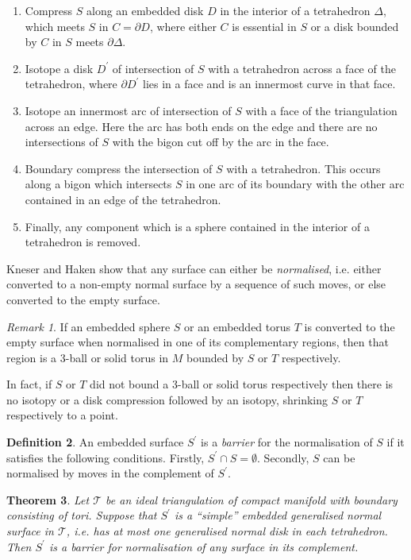 \documentclass[12pt,reqno]{amsart}  %
\newtheorem{thm}{Theorem}[section]
\theoremstyle{definition}
\newtheorem{defn}[thm]{Definition}
\theoremstyle{remark}
\newtheorem{rmk}[thm]{Remark}
\def\D{\Delta}
\newcommand{\T}{\mathcal{T}}
\begin{document}
\begin{enumerate}
\item 
Compress $S$ along an embedded disk $D$ in the interior of a tetrahedron 
$\D$, which meets $S$ in $C=\partial D$, where  either $C$ is essential in 
$S$ or a disk bounded by $C$ in $S$ meets $\partial \D$. 
\item 
Isotope a disk $D^\prime$ of intersection of $S$ with a tetrahedron across a 
face of the tetrahedron, where $\partial D^\prime$ lies in a face and is an 
innermost curve in that face. 
\item 
Isotope an innermost arc of intersection of $S$ with a face of the 
triangulation across an edge. Here the arc has both ends on the edge and 
there are no intersections of $S$ with the bigon cut off by the arc in 
the face. 
\item 
Boundary compress the intersection of $S$ with a tetrahedron. This occurs 
along a bigon which intersects $S$ in one arc of its boundary with the 
other arc contained in an edge of the tetrahedron. 
\item
Finally, any component which is a sphere contained in the interior of a 
tetrahedron is removed.
\end{enumerate}

Kneser \cite{Kn} and Haken \cite{Ha1} show that any surface can either be 
{\em normalised}, i.e. either converted to a non-empty normal surface 
by a sequence of such moves,  or else converted to the empty surface.

\begin{rmk}
If an embedded sphere $S$ or an embedded torus $T$ is converted to the 
empty surface when normalised in one of its complementary regions,
then that region is a 3-ball or solid torus in $M$ bounded by $S$ or $T$ 
respectively. 

In fact, if $S$ or $T$ did not bound a 3-ball or solid torus respectively 
then there is no isotopy or a disk compression followed by an isotopy, 
shrinking $S$ or $T$ respectively to a point. 
\end{rmk}

\begin{defn}
An embedded surface $S^\prime$ is a {\it barrier} for the normalisation of 
$S$ if it satisfies the following conditions. Firstly, 
$S^\prime \cap S = \emptyset$. Secondly, $S$ can be normalised by moves 
in the complement of $S^\prime$. 
\end{defn}

\begin{thm} 
Let $\T$ be an ideal triangulation  of compact manifold with boundary 
consisting of tori. Suppose that $S^\prime$ is a ``simple'' embedded 
generalised normal surface in $\T$, i.e. has at most one generalised 
normal disk in each tetrahedron. Then $S^\prime$ is a barrier for 
normalisation of any surface in its complement. 
\end{thm}
\end{document}
